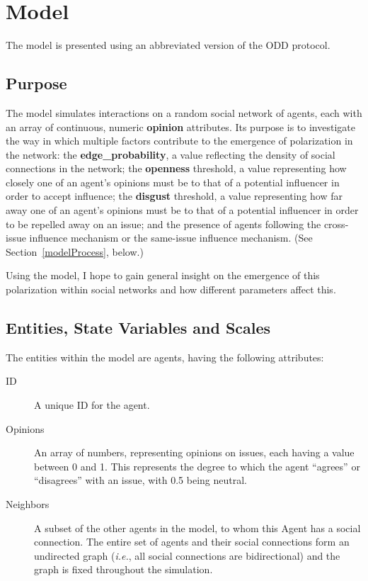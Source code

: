 \section{Model}

The model is presented using an abbreviated version of the ODD
protocol\cite{grimm_standard_2006}.

\subsection{Purpose}


The model simulates interactions on a random social network of agents, each
with an array of continuous, numeric \textbf{opinion} attributes. Its purpose
is to investigate the way in which multiple factors contribute to the emergence of
polarization in the network: the \textbf{edge\_probability}, a value reflecting
the density of social connections in the network; the \textbf{openness} threshold, a
value representing how closely one of an agent's opinions must be to that of a
potential influencer in order to accept influence; the \textbf{disgust} threshold, a value representing how far away one of an agent's opinions must be to that of a potential influencer in order to be repelled away on an issue; and the presence of agents following the cross-issue influence mechanism or the same-issue influence mechanism. (See
Section~\ref{modelProcess}, below.)

Using the model, I hope to gain general insight on the emergence of this
polarization within social networks and how different parameters affect this.

\subsection{Entities, State Variables and Scales}

The entities within the model are agents, having the following attributes:

\begin{description}
\item[ID] A unique ID for the agent.
\item[Opinions] An array of numbers, representing opinions on issues, each
having a value between 0 and 1. This represents the degree to which the agent
``agrees'' or ``disagrees'' with an issue, with 0.5 being neutral.
\item[Neighbors] A subset of the other agents in the model, to whom this Agent
has a social connection. The entire set of agents and their social connections
form an undirected graph (\textit{i.e.}, all social connections are
bidirectional) and the graph is fixed throughout the simulation.

\end{description}


